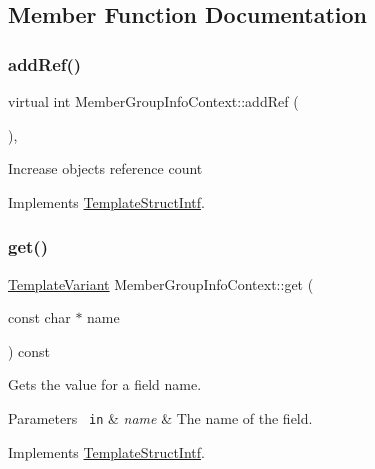 \subsection{Member Function Documentation}
\mbox{\label{class_member_group_info_context_a489cd4943cc9a565d3447a6024937a88}} 
\subsubsection{\texorpdfstring{addRef()}{addRef()}}
{\footnotesize\ttfamily virtual int Member\+Group\+Info\+Context\+::add\+Ref (\begin{DoxyParamCaption}{ }\end{DoxyParamCaption})\hspace{0.3cm}{\ttfamily [inline]}, {\ttfamily [virtual]}}

Increase object\textquotesingle{}s reference count 

Implements \mbox{\hyperlink{class_template_struct_intf_a05fe97ad47633beb326f69686faed581}{Template\+Struct\+Intf}}.

\mbox{\label{class_member_group_info_context_ada81dc489837e0e1cf6d9bef4711485d}} 
\subsubsection{\texorpdfstring{get()}{get()}}
{\footnotesize\ttfamily \mbox{\hyperlink{class_template_variant}{Template\+Variant}} Member\+Group\+Info\+Context\+::get (\begin{DoxyParamCaption}\item[{const char $\ast$}]{name }\end{DoxyParamCaption}) const\hspace{0.3cm}{\ttfamily [virtual]}}

Gets the value for a field name. 
\begin{DoxyParams}[1]{Parameters}
\mbox{\texttt{ in}}  & {\em name} & The name of the field. \\
\hline
\end{DoxyParams}


Implements \mbox{\hyperlink{class_template_struct_intf_a3d610cb81b4adbb531ebed3aa3d09b51}{Template\+Struct\+Intf}}.

